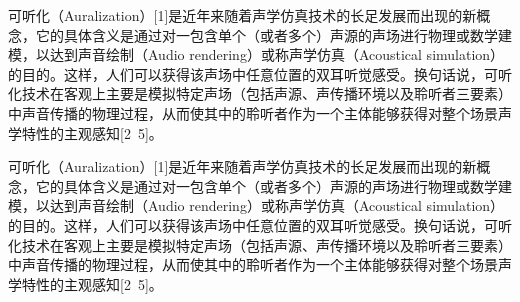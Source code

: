 \documentclass[a4paper,fontset=none]{ctexbook}
\begin{document}
可听化（Auralization）[1]是近年来随着声学仿真技术的长足发展而出现的新概念，它的具体含义是通过对一包含单个（或者多个）声源的声场进行物理或数学建模，以达到声音绘制（Audio rendering）或称声学仿真（Acoustical simulation）的目的。这样，人们可以获得该声场中任意位置的双耳听觉感受。换句话说，可听化技术在客观上主要是模拟特定声场（包括声源、声传播环境以及聆听者三要素）中声音传播的物理过程，从而使其中的聆听者作为一个主体能够获得对整个场景声学特性的主观感知[2~5]。

可听化（Auralization）[1]是近年来随着声学仿真技术的长足发展而出现的新概念，它的具体含义是通过对一包含单个（或者多个）声源的声场进行物理或数学建模，以达到声音绘制（Audio rendering）或称声学仿真（Acoustical simulation）的目的。这样，人们可以获得该声场中任意位置的双耳听觉感受。换句话说，可听化技术在客观上主要是模拟特定声场（包括声源、声传播环境以及聆听者三要素）中声音传播的物理过程，从而使其中的聆听者作为一个主体能够获得对整个场景声学特性的主观感知[2~5]。
\end{document}
